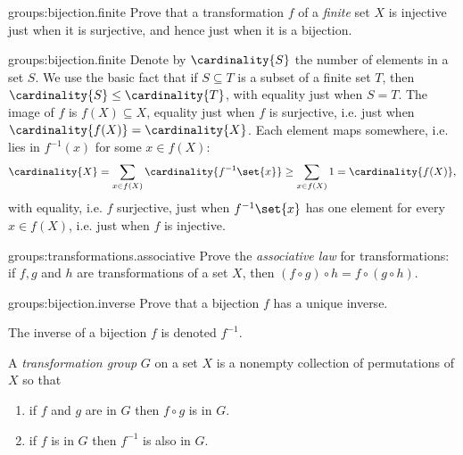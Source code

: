 \begin{problem}{groups:bijection.finite}
Prove that a transformation \(f\) of a \emph{finite} set \(X\) is injective just when it is surjective, and hence just when it is a bijection.
\end{problem}
\begin{answer}{groups:bijection.finite}
Denote by \(\cardinality{S}\) the number of elements in a set \(S\).
We use the basic fact that if \(S \subseteq T\) is a subset of a finite set \(T\), then \(\cardinality{S} \le \cardinality{T}\), with equality just when \(S=T\).
The image of \(f\) is \(f(X) \subseteq X\), equality just when \(f\) is surjective, i.e. just when \(\cardinality{f(X)}=\cardinality{X}\).
Each element maps somewhere, i.e. lies in \(f^{-1}(x)\) for some \(x \in f(X)\):
\[
\cardinality{X} = \sum_{x \in f(X)} \cardinality{f^{-1}\set{x}}
\ge \sum_{x \in f(X)} 1 = \cardinality{f(X)},
\]
with equality, i.e. \(f\) surjective, just when \(f^{-1}\set{x}\) has one element for every \(x \in f(X)\), i.e. just when \(f\) is injective.
\end{answer}
\begin{problem}{groups:transformations.associative}
Prove the \emph{associative law} for transformations: if \(f,g\) and \(h\) are transformations of a set \(X\), then \((f \circ g) \circ h=f \circ (g \circ h)\).
\end{problem}
\begin{problem}{groups:bijection.inverse}
Prove that a bijection \(f\) has a unique inverse.
\end{problem}
The inverse of a bijection \(f\) is denoted \(f^{-1}\).

A \emph{transformation group} \(G\) on a set \(X\) is a nonempty collection of permutations of \(X\) so that 
\begin{enumerate}
\item 
if \(f\) and \(g\) are in \(G\) then \(f \circ g\) is in \(G\).
\item
if \(f\) is in \(G\) then \(f^{-1}\) is also in \(G\).
\end{enumerate}

